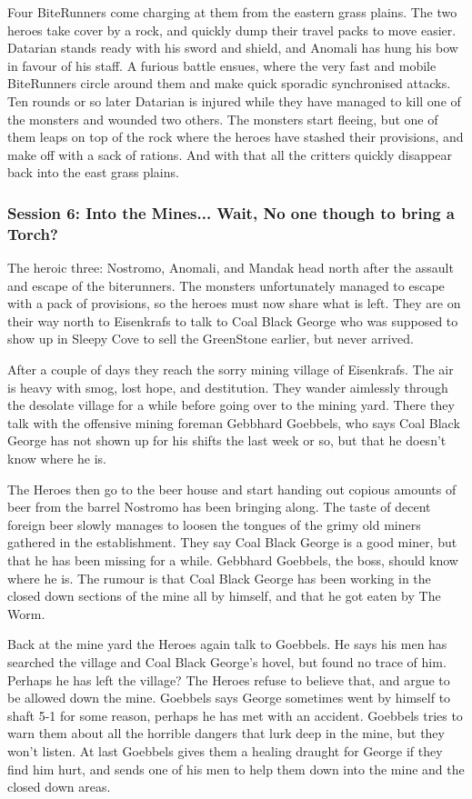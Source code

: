 Four BiteRunners come charging at them from the eastern grass plains. The two heroes take cover by a rock, and quickly dump their travel packs to move easier. Datarian stands ready with his sword and shield, and Anomali has hung his bow in favour of his staff. A furious battle ensues, where the very fast and mobile BiteRunners circle around them and make quick sporadic synchronised attacks. Ten rounds or so later Datarian is injured while they have managed to kill one of the monsters and wounded two others. The monsters start fleeing, but one of them leaps on top of the rock where the heroes have stashed their provisions, and make off with a sack of rations. And with that all the critters quickly disappear back into the east grass plains.


\subsubsection*{Session 6: Into the Mines... Wait, No one though to bring a Torch?}
The heroic three: Nostromo, Anomali, and Mandak head north after the assault and escape of the biterunners. The monsters unfortunately managed to escape with a pack of provisions, so the heroes must now share what is left. They are on their way north to Eisenkrafs to talk to Coal Black George who was supposed to show up in Sleepy Cove to sell the GreenStone earlier, but never arrived.

After a couple of days they reach the sorry mining village of Eisenkrafs. The air is heavy with smog, lost hope, and destitution. They wander aimlessly through the desolate village for a while before going over to the mining yard. There they talk with the offensive mining foreman Gebbhard Goebbels, who says Coal Black George has not shown up for his shifts the last week or so, but that he doesn't know where he is.

The Heroes then go to the beer house and start handing out copious amounts of beer from the barrel Nostromo has been bringing along. The taste of decent foreign beer slowly manages to loosen the tongues of the grimy old miners gathered in the establishment. They say Coal Black George is a good miner, but that he has been missing for a while. Gebbhard Goebbels, the boss, should know where he is. The rumour is that Coal Black George has been working in the closed down sections of the mine all by himself, and that he got eaten by The Worm.

Back at the mine yard the Heroes again talk to Goebbels. He says his men has searched the village and Coal Black George's hovel, but found no trace of him. Perhaps he has left the village? The Heroes refuse to believe that, and argue to be allowed down the mine. Goebbels says George sometimes went by himself to shaft 5-1 for some reason, perhaps he has met with an accident. Goebbels tries to warn them about all the horrible dangers that lurk deep in the mine, but they won't listen. At last Goebbels gives them a healing draught for George if they find him hurt, and sends one of his men to help them down into the mine and the closed down areas.

